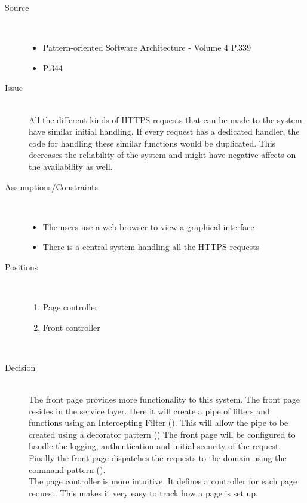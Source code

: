 


\begin{description}
\item [Source]~
\begin{itemize}
\item Pattern-oriented Software Architecture - Volume 4 \cite{wiley-4} P.339
\item \EAA  \cite{Fowler:2002:PEA:579257} P.344
\end{itemize}

\item [Issue]~\\
All the different kinds of HTTPS requests that can be made to the system have similar initial handling. If every request has a dedicated handler, the code for handling these similar functions would be duplicated. This decreases the reliability  of the system and might have negative affects on the availability as well.

\item [Assumptions/Constraints]~
\begin{itemize}
\item The users use a web browser to view a graphical interface
\item There is a central system handling all the HTTPS requests
\end{itemize}

\item [Positions]~
\begin{enumerate}
\item Page controller
\item Front controller 
\end{enumerate}

~\\[-1.5cm]
\item [Decision] ~\\
The front page provides more functionality to this system. The front page resides in the service layer. Here it will create a pipe of filters and functions using an Intercepting Filter (\cite{eaa}). This will allow the pipe to be created using a decorator pattern (\cite{eaa}) The front page will be configured to handle the logging, authentication and initial security of the request. Finally the front page dispatches the requests to the domain using the command pattern (\cite{eaa}). \\
The page controller is more intuitive. It defines a controller for each page request. This makes it very easy to track how a page is set up.


\end{description}
